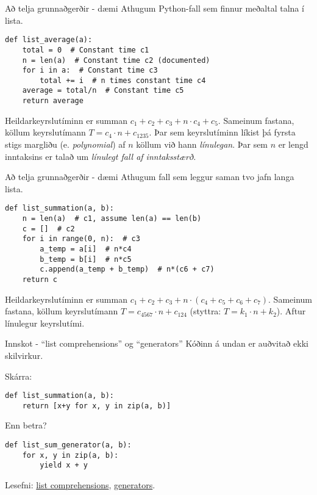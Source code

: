 \documentclass{beamer}
\begin{document}
\begin{frame}[fragile]{Að telja grunnaðgerðir - dæmi}
Athugum Python-fall sem finnur meðaltal talna í lista.

\begin{verbatim}
def list_average(a):
    total = 0  # Constant time c1
    n = len(a)  # Constant time c2 (documented)
    for i in a:  # Constant time c3
        total += i  # n times constant time c4
    average = total/n  # Constant time c5
    return average
\end{verbatim}

Heildarkeyrslutíminn er summan $c_1 + c_2 + c_3 + n\cdot c_4 + c_5$. Sameinum fastana, köllum keyrslutímann $T = c_4 \cdot n + c_{1235}$. Þar sem keyrslutíminn líkist þá fyrsta stigs margliðu (e. \emph{polynomial}) af $n$ köllum við hann \emph{línulegan}. Þar sem $n$ er lengd inntaksins er talað um \emph{línulegt fall af inntaksstærð.}
\end{frame}

\begin{frame}[fragile]{Að telja grunnaðgerðir - dæmi}
Athugum fall sem leggur saman tvo jafn langa lista.
\begin{verbatim}
def list_summation(a, b):
    n = len(a)  # c1, assume len(a) == len(b)
    c = []  # c2
    for i in range(0, n):  # c3
        a_temp = a[i]  # n*c4
        b_temp = b[i]  # n*c5
        c.append(a_temp + b_temp)  # n*(c6 + c7)
    return c
\end{verbatim}

Heildarkeyrslutíminn er summan $c_1 + c_2 + c_3 + n\cdot (c_4 + c_5 + c_6 + c_7)$. Sameinum fastana, köllum keyrslutímann $T = c_{4567}\cdot n + c_{124}$ (styttra: $T = k_1\cdot n + k_2$). Aftur línulegur keyrslutími.
\end{frame}

\begin{frame}[fragile]{Innskot - ``list comprehensions'' og ``generators''}
Kóðinn á undan er auðvitað ekki skilvirkur.

Skárra:
\begin{verbatim}
def list_summation(a, b):
    return [x+y for x, y in zip(a, b)]
\end{verbatim}

Enn betra?
\begin{verbatim}
def list_sum_generator(a, b):
    for x, y in zip(a, b):
        yield x + y
\end{verbatim}

Lesefni: \href{https://docs.python.org/3/tutorial/datastructures.html#list-comprehensions}{list comprehensions}, \href{http://freepythontips.wordpress.com/2013/09/29/the-python-yield-keyword-explained/}{generators}.
\end{frame}
\end{document}
